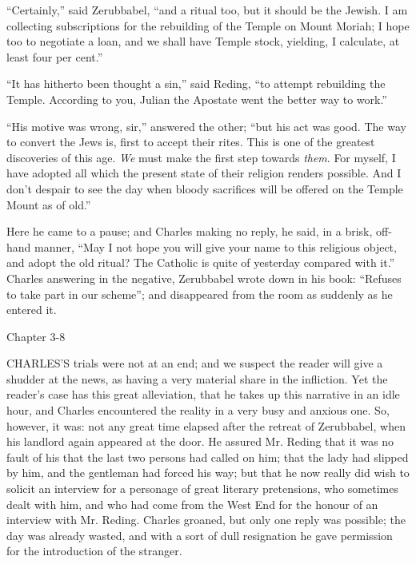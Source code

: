 ``Certainly,'' said Zerubbabel, ``and a ritual too, but
it should be the Jewish. I am collecting subscriptions for the
rebuilding of the Temple on Mount Moriah; I hope too to negotiate a
loan, and we shall have Temple stock, yielding, I calculate, at least
four per cent.''

``It has hitherto been thought a sin,'' said Reding,
``to attempt rebuilding the Temple. According to you, Julian the
Apostate went the better way to work.''

``His motive was wrong, sir,'' answered the other;
``but his act was good. The way to convert the Jews is, first to
accept their rites. This is one of the greatest discoveries of this
age. \emph{We} must make the first step towards \emph{them}. For
myself, I have adopted all which the present state of their religion
renders possible. And I don't despair to see the day when bloody
sacrifices will be offered on the Temple Mount as of old.''

Here he came to a pause; and Charles making no reply, he said, in a
brisk, off-hand manner, ``May I not hope you will give your name
to this religious object, and adopt the old ritual? The Catholic is
quite of yesterday compared with it.'' Charles answering in the
negative, Zerubbabel wrote down in his book: ``Refuses to take
part in our scheme''; and disappeared from the room as suddenly as
he entered it.

Chapter 3-8


CHARLES'S trials were not at an end;
and we suspect the reader will give a shudder at the news, as having a
very material share in the infliction. Yet the reader's case has this
great alleviation, that he takes up this narrative in an idle hour,
and Charles encountered the reality in a very busy and anxious one.
So, however, it was: not any great time elapsed after the retreat of
Zerubbabel, when his landlord again appeared at the door. He assured
Mr. Reding that it was no fault of his that the last two persons had
called on him; that the lady had slipped by him, and the gentleman had
forced his way; but that he now really did wish to solicit an
interview for a personage of great literary pretensions, who sometimes
dealt with him, and who had come from the West End for the honour of
an interview with Mr. Reding. Charles groaned, but only one reply was
possible; the day was already wasted, and with a sort of dull
resignation he gave permission for the introduction of the stranger.

